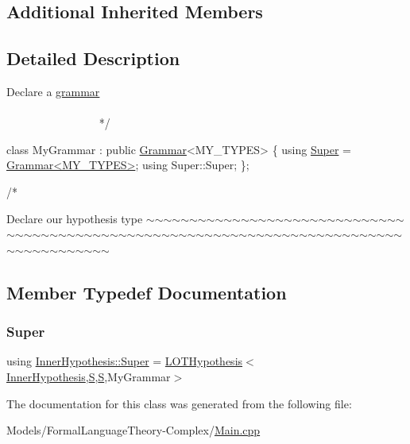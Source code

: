 \subsection*{Additional Inherited Members}


\subsection{Detailed Description}

\begin{DoxyCode}
    Declare a \hyperlink{class_l_o_t_hypothesis_affae32db28c39df676809ae47e14e7cf}{grammar}
   ~~~~~~~~~~~~~~~~~~~~~~~~~~~~~~~~~~~~~~~~~~~~~~~~~~~~~~~~~~~~~~~~~~~~~~~~~~~~~~~~~~~~~~~~ */



\textcolor{keyword}{class }MyGrammar : \textcolor{keyword}{public} \hyperlink{class_grammar}{Grammar}<MY\_TYPES> \{
    \textcolor{keyword}{using} \hyperlink{class_inner_hypothesis_a1a69a8dd433b64b725be0b2436d6df0c}{Super} = \hyperlink{class_grammar}{Grammar<MY\_TYPES>};
    \textcolor{keyword}{using} Super::Super;
\};

\textcolor{comment}{/*}
\end{DoxyCode}
 Declare our hypothesis type $\sim$$\sim$$\sim$$\sim$$\sim$$\sim$$\sim$$\sim$$\sim$$\sim$$\sim$$\sim$$\sim$$\sim$$\sim$$\sim$$\sim$$\sim$$\sim$$\sim$$\sim$$\sim$$\sim$$\sim$$\sim$$\sim$$\sim$$\sim$$\sim$$\sim$$\sim$$\sim$$\sim$$\sim$$\sim$$\sim$$\sim$$\sim$$\sim$$\sim$$\sim$$\sim$$\sim$$\sim$$\sim$$\sim$$\sim$$\sim$$\sim$$\sim$$\sim$$\sim$$\sim$$\sim$$\sim$$\sim$$\sim$$\sim$$\sim$$\sim$$\sim$$\sim$$\sim$$\sim$$\sim$$\sim$$\sim$$\sim$$\sim$$\sim$$\sim$$\sim$$\sim$$\sim$$\sim$$\sim$$\sim$$\sim$$\sim$$\sim$$\sim$$\sim$$\sim$$\sim$$\sim$$\sim$$\sim$$\sim$ 

\subsection{Member Typedef Documentation}
\mbox{\label{class_inner_hypothesis_a1a69a8dd433b64b725be0b2436d6df0c}} 
\subsubsection{\texorpdfstring{Super}{Super}}
{\footnotesize\ttfamily using \hyperlink{class_inner_hypothesis_a1a69a8dd433b64b725be0b2436d6df0c}{Inner\+Hypothesis\+::\+Super} =  \hyperlink{class_l_o_t_hypothesis}{L\+O\+T\+Hypothesis}$<$\hyperlink{class_inner_hypothesis}{Inner\+Hypothesis},\hyperlink{_models_2_formal_language_theory-_complex_2_main_8cpp_a51c40915539205f0b5add30b0d68a4cb}{S},\hyperlink{_models_2_formal_language_theory-_complex_2_main_8cpp_a51c40915539205f0b5add30b0d68a4cb}{S},My\+Grammar$>$}



The documentation for this class was generated from the following file\+:\begin{DoxyCompactItemize}
\item 
Models/\+Formal\+Language\+Theory-\/\+Complex/\hyperlink{_models_2_formal_language_theory-_complex_2_main_8cpp}{Main.\+cpp}\end{DoxyCompactItemize}
